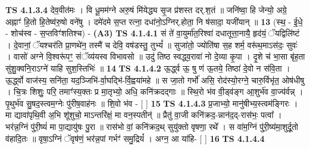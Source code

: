 \documentclass[17pt]{extarticle}
\begin{document}
                  \newline
                                \textbf{ TS 4.1.3.4} \newline
                  देव॒वीत॑मः । वि धू॒मम॑ग्ने अरु॒षं मि॑येद्ध्य सृ॒ज प्र॑शस्त दर्.श॒तं ॥ जनि॑ष्वा॒ हि जेन्यो॒ अग्रे॒ अह्नाꣳ॑ हि॒तो हि॒तेष्व॑रु॒षो वने॑षु । दमे॑दमे स॒प्त रत्ना॒ दधा॑नो॒ऽग्निर्.होता॒ नि ष॑सादा॒ यजी॑यान् ॥ \textbf{  13} \newline
                  \newline
                      (स्थ॒ - ई॒धे॒ - शोच॑स्व - स॒प्तविꣳ॑शतिश्च) -  \textbf{(A3)} \newline \newline
                                        \textbf{ TS 4.1.4.1} \newline
                  सं ते॑ वा॒युर्मा॑त॒रिश्वा॑ दधातूत्ता॒नायै॒ हृद॑यं॒ ॅयद्विलि॑ष्टं । दे॒वानां॒ ॅयश्चर॑ति प्रा॒णथे॑न॒ तस्मै॑ च देवि॒ वष॑डस्तु॒ तुभ्यं᳚ ॥ सुजा॑तो॒ ज्योति॑षा स॒ह शर्म॒ वरू॑थ॒माऽस॑दः॒ सुवः॑ । वासो॑ अग्ने वि॒श्वरू॑पꣳ॒॒ संॅव्य॑यस्व विभावसो ॥ उदु॑ तिष्ठ स्वद्ध्व॒रावा॑ नो दे॒व्या कृ॒पा । दृ॒शे च॑ भा॒सा बृ॑ह॒ता सु॑शु॒क्वनि॒राऽग्ने॑ याहि सुश॒स्तिभिः॑ ॥ \textbf{  14} \newline
                  \newline
                                \textbf{ TS 4.1.4.2} \newline
                  ऊ॒र्द्ध्व ऊ॒ षु ण॑ ऊ॒तये॒ तिष्ठा॑ दे॒वो न स॑वि॒ता । ऊ॒र्द्ध्वो वाज॑स्य॒ सनि॑ता॒ यद॒ञ्जिभि॑-र्वा॒घद्भि॑-र्वि॒ह्वया॑महे ॥ स जा॒तो गर्भो॑ असि॒ रोद॑स्यो॒रग्ने॒ चारु॒र्विभृ॑त॒ ओष॑धीषु । चि॒त्रः शिशुः॒ परि॒ तमाꣳ॑स्य॒क्तः प्र मा॒तृभ्यो॒ अधि॒ कनि॑क्रदद्गाः ॥ स्थि॒रो भ॑व वी॒ड्व॑ङ्ग आ॒शुर्भ॑व वा॒ज्य॑र्वन्न् । पृ॒थुर्भ॑व सु॒षद॒स्त्वम॒ग्नेः पु॑रीष॒वाह॑नः ॥ शि॒वो भ॑व - [  ] \textbf{  15 } \newline
                  \newline
                                \textbf{ TS 4.1.4.3} \newline
                  प्र॒जाभ्यो॒ मानु॑षीभ्य॒स्त्वम॑ङ्गिरः । मा द्यावा॑पृथि॒वी अ॒भि शू॑शुचो॒ माऽन्तरि॑क्षं॒ मा वन॒स्पतीन्॑ ॥ प्रैतु॑ वा॒जी कनि॑क्रद॒-न्नान॑द॒द्-रास॑भः॒ पत्वा᳚ । भर॑न्न॒ग्निं पु॑री॒ष्यं॑ मा पा॒द्यायु॑षः पु॒रा ॥ रास॑भो वां॒ कनि॑क्रद॒थ् सुयु॑क्तो वृषणा॒ रथे᳚ । स वा॑म॒ग्निं पु॑री॒ष्य॑मा॒शुर्दू॒तो व॑हादि॒तः ॥ वृषा॒ऽग्निं ॅवृष॑णं॒ भर॑न्न॒पां गर्भꣳ॑ समु॒द्रियं᳚ । अग्न॒ आ या॑हि- [  ] \textbf{  16} \newline
                  \newline
                                \textbf{ TS 4.1.4.4} \newline
\end{document}
